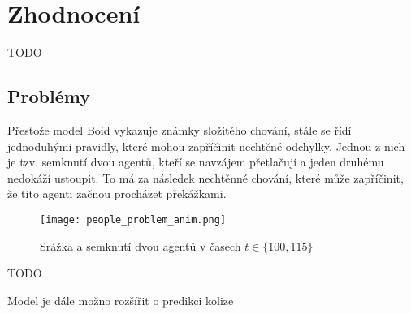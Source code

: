 \section{Zhodnocení}
TODO

\subsection{Problémy}
Přestože model Boid vykazuje známky složitého chování, stále se řídí jednoduhými pravidly, které mohou zapříčinit nechtěné odchylky. Jednou z nich je tzv. semknutí dvou agentů, kteří se navzájem přetlačují a jeden druhému nedokáží ustoupit. To má za následek nechtěnné chování, které může zapříčinit, že tito agenti začnou procházet překážkami. 
\begin{figure}[H]
	\texttt{[image: people\_problem\_anim.png]}
	\centering
	\caption{Srážka a semknutí dvou agentů v časech $t\in\{ 100, 115\} $}
\end{figure}

TODO

Model je dále možno rozšířit o predikci kolize \cite{Golas2013}